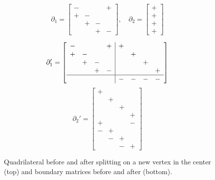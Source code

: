\documentclass[twocolumn]{article}
\begin{document}
\begin{figure}[h]
    {\small
        \begin{equation*}
            \partial_1 = \left[\begin{matrix}
                - &   &   & + \\
                + & - &   &   \\
                  & + & - &   \\
                  &   & + & -
            \end{matrix}\right],
            \quad
            \partial_2 = \left[\begin{matrix}
                + \\ + \\ + \\ +
            \end{matrix}\right]
        \end{equation*}

        \begin{equation*}
            \partial_1' = \left[\begin{array}{cccc|cccc}
                - &   &   & + & + &   &   &   \\
                + & - &   &   &   & + &   &   \\
                  & + & - &   &   &   & + &   \\
                  &   & + & - &   &   &   & + \\
                \hline
                  &   &   &   & - & - & - & -
            \end{array}\right]
        \end{equation*}
        \begin{equation*}
            \partial_2' = \left[\begin{array}{cccc}
                + &   &   &   \\
                  & + &   &   \\
                  &   & + &   \\
                  &   &   & + \\
                \hline
                + &   &   & - \\
                - & + &   &   \\
                  & - & + &   \\
                  &   & - & +
            \end{array}\right]
        \end{equation*}
    }

    \caption{Quadrilateral before and after splitting on a new vertex in the center (top) and boundary matrices before and after (bottom).}
    \label{fig:split-transformation}
\end{figure}
\end{document}
